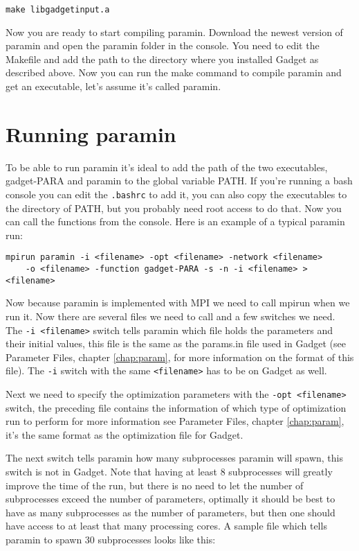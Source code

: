 \documentclass[]{book}
\begin{document}
\begin{verbatim}
make libgadgetinput.a
\end{verbatim}

Now you are ready to start compiling paramin. Download the newest
version of paramin and open the paramin folder in the console. You need
to edit the Makefile and add the path to the directory where you
installed Gadget as described above. Now you can run the make command to
compile paramin and get an executable, let's assume it's called paramin.

\hypertarget{sec:runparamin}{%
\section{Running paramin}\label{sec:runparamin}}

To be able to run paramin it's ideal to add the path of the two
executables, gadget-PARA and paramin to the global variable PATH. If
you're running a bash console you can edit the \texttt{.bashrc} to add it, you
can also copy the executables to the directory of PATH, but you probably
need root access to do that. Now you can call the functions from the
console. Here is an example of a typical paramin run:

\begin{verbatim}
mpirun paramin -i <filename> -opt <filename> -network <filename> 
    -o <filename> -function gadget-PARA -s -n -i <filename> > <filename>
\end{verbatim}

Now because paramin is implemented with MPI we need to call mpirun when
we run it. Now there are several files we need to call and a few
switches we need. The \texttt{-i\ \textless{}filename\textgreater{}} switch tells paramin which file
holds the parameters and their initial values, this file is the same as
the params.in file used in Gadget (see Parameter Files,
chapter \ref{chap:param},
for more information on the format of this file). The \texttt{-i} switch with
the same \texttt{\textless{}filename\textgreater{}} has to be on Gadget as well.

Next we need to specify the optimization parameters with the
\texttt{-opt\ \textless{}filename\textgreater{}} switch, the preceding file contains the information of
which type of optimization run to perform for more information see
Parameter Files, chapter \ref{chap:param}, it's the same format as the optimization file
for Gadget.

The next switch tells paramin how many subprocesses paramin will spawn,
this switch is not in Gadget. Note that having at least 8 subprocesses
will greatly improve the time of the run, but there is no need to let
the number of subprocesses exceed the number of parameters, optimally it
should be best to have as many subprocesses as the number of parameters,
but then one should have access to at least that many processing cores.
A sample file which tells paramin to spawn 30 subprocesses looks like
this:
\end{document}
